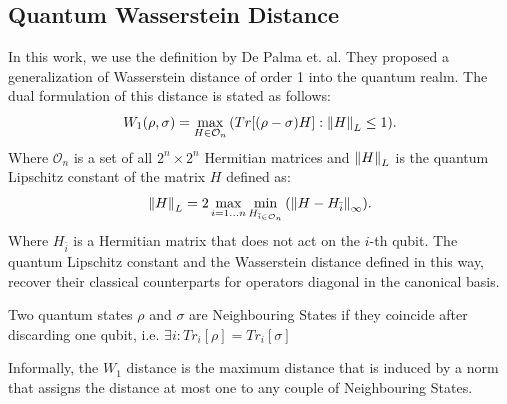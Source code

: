 \subsection{Quantum Wasserstein Distance}
In this work, we use the definition by De Palma et.
al\cite{depalma2020quantum}. They proposed a generalization of
Wasserstein distance of order 1 into the quantum realm. The dual formulation of
this distance is stated as follows:
\begin{equation}
  W_1(\rho, \sigma) = \max_{H \in \mathcal{O}_n}{(Tr[(\rho - \sigma)H]: \left\lVert H\right\rVert_L \leq 1
    )}.
  \label{eq:w1_distance_general}
\end{equation}
Where $\mathcal{O}_n$ is a set of all $2^n \times 2^n$ Hermitian matrices and 
$\left\lVert H\right\rVert_L$ is the quantum Lipschitz constant of the matrix $H$ defined as:
\begin{equation}
  \left\lVert H\right\rVert_L = 2 \max_{i=1\ldots n}{\min_{H_{\bar{i} \in \mathcal{O}_n}}{(\left\lVert H - H_{\bar{i}}\right\rVert_\infty)}}.
  \label{eq:quantum_lipschitz_constant}
\end{equation}
Where $H_{\bar{i}}$ is a Hermitian matrix that does not act on the $i$-th qubit.
The quantum Lipschitz constant and the Wasserstein distance defined in this way,
recover their classical counterparts for operators diagonal in the canonical basis.

\begin{definition}
  Two quantum states $\rho$ and $\sigma$ are Neighbouring States if they
  coincide after discarding one qubit, i.e. $\exists i: Tr_i[\rho]=Tr_i[\sigma]$
\end{definition}

Informally, the $W_1$ distance is the maximum distance that is induced by a norm
that assigns the distance at most one to any couple of Neighbouring States. 


